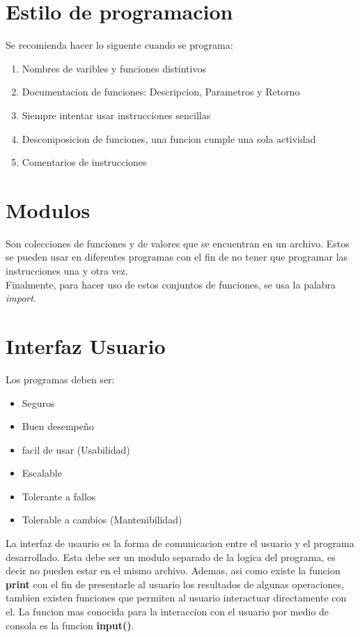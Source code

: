 \documentclass{article}
\begin{document}
\section{Estilo de programacion}
Se recomienda hacer lo siguente cuando se programa:
\begin{enumerate}
    \item Nombres de varibles y funciones distintivos
    \item Documentacion de funciones: Descripcion, Parametros y Retorno
    \item Siempre intentar usar instrucciones sencillas
    \item Descomposicion de funciones, una funcion cumple una sola actividad
    \item Comentarios de instrucciones
\end{enumerate}
\section{Modulos}
Son colecciones de funciones y de valores que se encuentran en un archivo. Estos se pueden usar en diferentes programas con el fin de no tener que programar las instrucciones una y otra vez.\\
Finalmente, para hacer uso de estos conjuntos de funciones, se usa la palabra \textit{import}. 
\section{Interfaz Usuario}
Los programas deben ser:
\begin{itemize}
    \item Seguros
    \item Buen desempeño
    \item facil de usar (Usabilidad)
    \item Escalable
    \item Tolerante a fallos
    \item Tolerable a cambios (Mantenibilidad)
\end{itemize}
La interfaz de usaurio es la forma de comunicacion entre el usuario y el programa desarrollado. Esta debe ser un modulo separado de la logica del programa, es decir no pueden estar en el mismo archivo. Ademas, asi como existe la funcion \textbf{print} con el fin de presentarle al usuario los resultados de algunas operaciones, tambien existen funciones que permiten al usuario interactuar directamente con el. La funcion mas conocida para la interaccion con el usuario por medio de consola es la funcion \textbf{input()}.  
\end{document}
